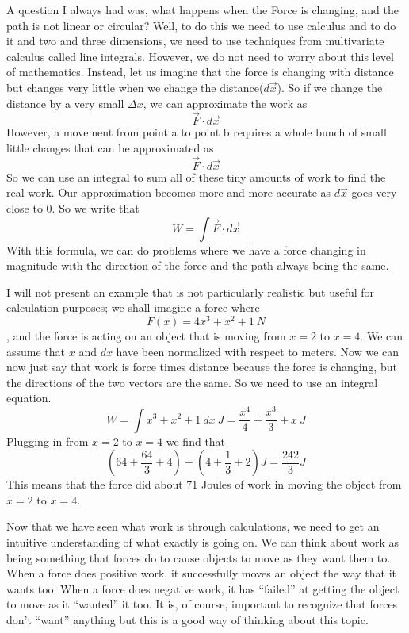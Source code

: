 \documentclass{article}[gray]
\numberwithin{equation}{subsection}
\begin{document}
A question I always had was, what happens when the Force is changing, and the path is not linear or circular? Well, to do this we need to use calculus and to do it and two and three dimensions, we need to use techniques from multivariate calculus called line integrals. However, we do not need to worry about this level of mathematics. Instead, let us imagine that the force is changing with distance but changes very little when we change the distance($d\vec{x}$). So if we change the distance by a very small $\Delta x$, we can approximate the work as $$\vec{F} \cdot d\vec{x}$$ However, a movement from point a to point b requires a whole bunch of small little changes that can be approximated as $$\vec{F} \cdot d\vec{x}$$ So we can use an integral to sum all of these tiny amounts of work to find the real work. Our approximation becomes more and more accurate as $d\vec{x}$ goes very close to 0. So we write that \begin{equation}W=\int{\vec{F} \cdot d\vec{x}}\end{equation} With this formula, we can do problems where we have a force changing in magnitude with the direction of the force and the path always being the same.

I will not present an example that is not particularly realistic but useful for calculation purposes; we shall imagine a force where \begin{equation}F\left(x\right)=4x^3+x^2+1 \ N\end{equation}, and the force is acting on an object that is moving from $x=2$ to $x=4$. We can assume that $x$ and $dx$ have been normalized with respect to meters. Now we can now just say that work is force times distance because the force is changing, but the directions of the two vectors are the same. So we need to use an integral equation. \begin{equation}W=\int x^3+x^2+1 \ dx \ J= \frac{x^4}{4}+\frac{x^3}{3}+x \ J\end{equation} Plugging in from $x=2$ to $x=4$ we find that   $$\left(64+\frac{64}{3}+4\right)-\left(4+\frac{1}{3}+2\right) J= \frac{242}{3} J$$ This means that the force did about 71 Joules of work in moving the object from $x=2$ to $x=4$. 

Now that we have seen what work is through calculations, we need to get an intuitive understanding of what exactly is going on. We can think about work as being something that forces do to cause objects to move as they want them to. When a force does positive work, it successfully moves an object the way that it wants too. When a force does negative work, it has “failed” at getting the object to move as it “wanted” it too. It is, of course, important to recognize that forces don’t “want” anything but this is a good way of thinking about this topic. 
\end{document}
